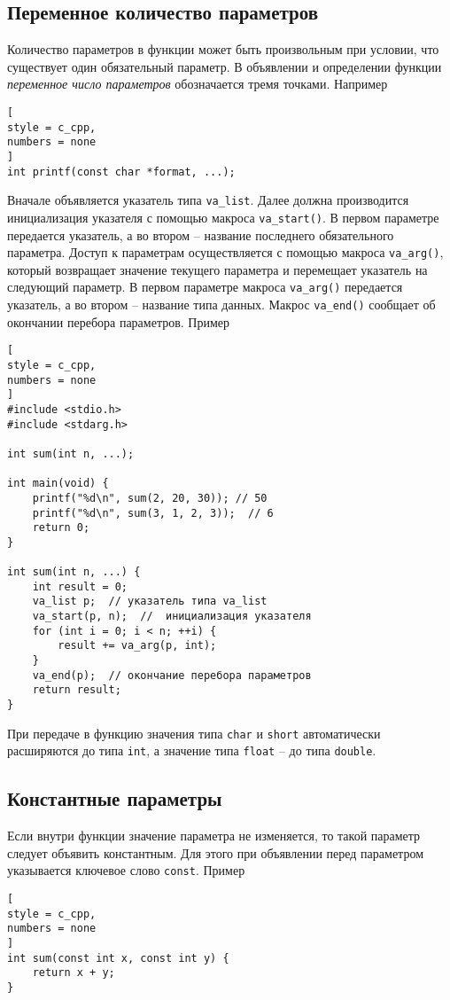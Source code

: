 \documentclass[%
	11pt,
	a4paper,
	utf8,
		]{article}
\begin{document}
\subsection{Переменное количество параметров}

Количество параметров в функции может быть произвольным при условии, что существует один обязательный параметр. В объявлении и определении функции \emph{переменное число параметров} обозначается тремя точками. Например
\begin{lstlisting}[
style = c_cpp,
numbers = none
]
int printf(const char *format, ...);
\end{lstlisting}

Вначале объявляется указатель типа \verb|va_list|. Далее должна производится инициализация указателя с помощью макроса \verb|va_start()|. В первом параметре передается указатель, а во втором -- название последнего обязательного параметра. Доступ к параметрам осуществляется с помощью макроса \verb|va_arg()|, который возвращает значение текущего параметра и перемещает указатель на следующий параметр. В первом параметре макроса \verb|va_arg()| передается указатель, а во втором -- название типа данных. Макрос \verb|va_end()| сообщает об окончании перебора параметров. Пример
\begin{lstlisting}[
style = c_cpp,
numbers = none
]
#include <stdio.h>
#include <stdarg.h>

int sum(int n, ...);

int main(void) {
    printf("%d\n", sum(2, 20, 30)); // 50
    printf("%d\n", sum(3, 1, 2, 3));  // 6
    return 0;
}

int sum(int n, ...) {
    int result = 0;
    va_list p;  // указатель типа va_list
    va_start(p, n);  //  инициализация указателя
    for (int i = 0; i < n; ++i) {
        result += va_arg(p, int);
    }
    va_end(p);  // окончание перебора параметров
    return result;
}
\end{lstlisting}

При передаче в функцию значения типа \verb|char| и \verb|short| автоматически расширяются до типа \verb|int|, а значение типа \verb|float| -- до типа \verb|double|.

\subsection{Константные параметры}

Если внутри функции значение параметра не изменяется, то такой параметр следует объявить константным. Для этого при объявлении перед параметром указывается ключевое слово \verb|const|. Пример
\begin{lstlisting}[
style = c_cpp,
numbers = none
]
int sum(const int x, const int y) {
    return x + y;
}
\end{lstlisting}
\end{document}
